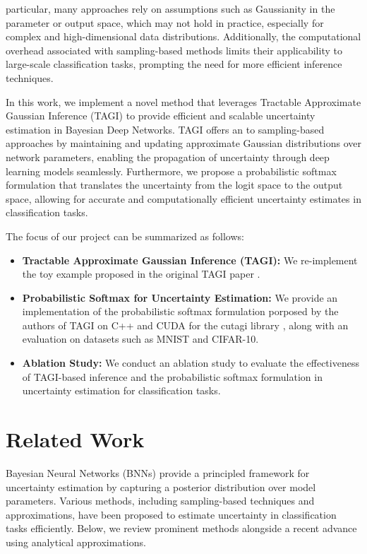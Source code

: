 \documentclass{article}
\begin{document}
particular, many approaches rely on assumptions such as Gaussianity in the parameter or output space, which may not hold in practice, especially for complex and high-dimensional data distributions. Additionally, the computational overhead associated with sampling-based methods limits their applicability to large-scale classification tasks, prompting the need for more efficient inference techniques.

In this work, we implement a novel method that leverages Tractable Approximate Gaussian Inference (TAGI) to provide efficient and scalable uncertainty estimation in Bayesian Deep Networks. TAGI offers an to sampling-based approaches by maintaining and updating approximate Gaussian distributions over network parameters, enabling the propagation of uncertainty through deep learning models seamlessly. Furthermore, we propose a probabilistic softmax formulation that translates the uncertainty from the logit space to the output space, allowing for accurate and computationally efficient uncertainty estimates in classification tasks.

The focus of our project can be summarized as follows:

\begin{itemize}
    \item \textbf{Tractable Approximate Gaussian Inference (TAGI):} We re-implement the toy example proposed in the original TAGI paper \cite{goulet2020tractable}.
    \item \textbf{Probabilistic Softmax for Uncertainty Estimation:} We provide an implementation of the probabilistic softmax formulation porposed by the authors of TAGI on C++ and CUDA for the cutagi library \cite{}, along with an evaluation on datasets such as MNIST and CIFAR-10.
    \item \textbf{Ablation Study:} We conduct an ablation study to evaluate the effectiveness of TAGI-based inference and the probabilistic softmax formulation in uncertainty estimation for classification tasks.
\end{itemize}

\section{Related Work}\label{sec:related_work}
Bayesian Neural Networks (BNNs) provide a principled framework for uncertainty estimation by capturing a posterior distribution over model parameters. Various methods, including sampling-based techniques and approximations, have been proposed to estimate uncertainty in classification tasks efficiently. Below, we review prominent methods alongside a recent advance using analytical approximations.
\end{document}
